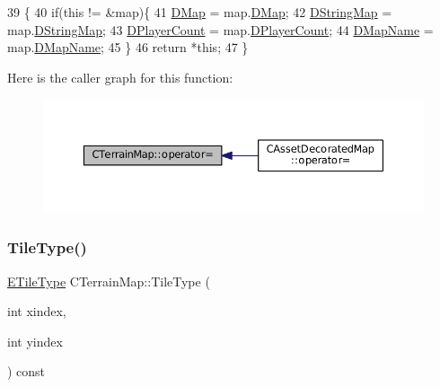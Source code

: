 \begin{DoxyCode}
39                                                          \{
40     \textcolor{keywordflow}{if}(\textcolor{keyword}{this} != &map)\{
41         \hyperlink{classCTerrainMap_a80d154ce478948b10473534a7bca13f6}{DMap} = map.\hyperlink{classCTerrainMap_a80d154ce478948b10473534a7bca13f6}{DMap};
42         \hyperlink{classCTerrainMap_a76db5fd05e22e0aea413f49175f9c282}{DStringMap} = map.\hyperlink{classCTerrainMap_a76db5fd05e22e0aea413f49175f9c282}{DStringMap};
43         \hyperlink{classCTerrainMap_a79e2cf566ac9dfbaddd2c73ea256785b}{DPlayerCount} = map.\hyperlink{classCTerrainMap_a79e2cf566ac9dfbaddd2c73ea256785b}{DPlayerCount};
44         \hyperlink{classCTerrainMap_a9026e4a5f073885b9e9fc3b43e93caa6}{DMapName} = map.\hyperlink{classCTerrainMap_a9026e4a5f073885b9e9fc3b43e93caa6}{DMapName}; 
45     \}
46     \textcolor{keywordflow}{return} *\textcolor{keyword}{this};
47 \}
\end{DoxyCode}
Here is the caller graph for this function\+:\nopagebreak
\begin{figure}[H]
\begin{center}
\leavevmode
\includegraphics[width=350pt]{classCTerrainMap_ad9f476d5d4db6de2907dfa3d4d9de7e6_icgraph}
\end{center}
\end{figure}
\hypertarget{classCTerrainMap_a7e0e440467a09cb1c59e2bdbec01ccb4}{}\label{classCTerrainMap_a7e0e440467a09cb1c59e2bdbec01ccb4} 
\subsubsection{\texorpdfstring{Tile\+Type()}{TileType()}\hspace{0.1cm}{\footnotesize\ttfamily [1/2]}}
{\footnotesize\ttfamily \hyperlink{classCTerrainMap_aff2ab991e237269941416dd79d8871d4}{E\+Tile\+Type} C\+Terrain\+Map\+::\+Tile\+Type (\begin{DoxyParamCaption}\item[{int}]{xindex,  }\item[{int}]{yindex }\end{DoxyParamCaption}) const\hspace{0.3cm}{\ttfamily [inline]}}



